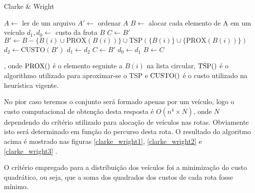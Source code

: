 \documentclass[a4paper, 12pt]{article}
\begin{document}
{\newcommand{\prox}[1]{\textrm{PROX}(#1)}
\newcommand{\tsp}[1]{\textrm{TSP}(#1)}
\newcommand{\cust}[1]{\textrm{CUSTO}(#1)}
\begin{algorithm}[H]
\caption{Clarke \& Wright}
\begin{algorithmic}
	\State $A \leftarrow $ ler de um arquivo
	\State $A' \leftarrow$ ordenar $A$
	\State $B \leftarrow$ alocar cada elemento de A em um veículo
	\State $d_1,d_0 \leftarrow $ custo da frota $B$
	\State $C \leftarrow B'$
			\State $B' \leftarrow B-\{B(i)\cup\prox{B(i)}\}\cup\tsp{\{B(i)\}\cup\{\prox{B(i)}\}}$ 
			\State $d_2 \leftarrow \cust{B'}$
				\State $d_1 \leftarrow d_2$
				\State $C \leftarrow B'$
			\EndIf
		\EndFor
			\State $d_0 \leftarrow d_1$
			\State $B \leftarrow C$
		\EndIf
	\EndWhile
\end{algorithmic}
\end{algorithm}
,
	onde $\prox$ é o elemento seguinte a $B(i)$ na lista circular, $\tsp$ é o
algorithmo utilizado para aproximar-se o TSP e $\cust$ é o custo utilizado na
heurística vigente.
}

	No pior caso teremos o conjunto será formado apenas por um veículo, logo o
custo computacional de obtenção desta resposta é $O(n^4\times N)$, onde $N$ dependendo do
crítério utilizado para alocação de veículos nas rotas. Obviamente isto será
determinado em função do percurso desta rota. O resultado do algoritmo acima é
mostrado nas figuras \ref{clarke_wright1}, \ref{clarke_wright2}  e
\ref{clarke_wright3} .


\newpage

	O critério empregado para a distribuição dos veículos foi a minimização do
custo quadrático, ou seja, que a soma dos quadrados dos custos de cada rota
fosse mínimo. 
\end{document}
